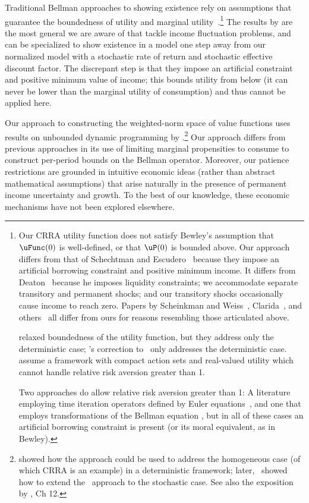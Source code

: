 \documentclass[BufferStockTheory]{subfiles}
\begin{document}
Traditional Bellman approaches to showing existence rely on assumptions that guarantee the boundedness of utility and marginal utility~\citep{slpMethods}.\footnote{Our CRRA utility function does not satisfy Bewley's assumption that $\uFunc(0)$ is well-defined, or that $\uP(0)$ is bounded above. 
  Our approach differs from that of Schechtman and Escudero~\citeyearpar{seIncFluct} because they impose an artificial borrowing constraint and positive minimum income.
  It differs from Deaton~\citeyearpar{deatonLiqConstr} because he imposes liquidity constraints; we accommodate separate transitory and permanent shocks; and our transitory shocks occasionally cause income to reach zero.
  Papers by Scheinkman and Weiss~\citeyearpar{scheinkman&weiss:borrowing}, Clarida~\citep{claridaErgodic}, and others~\cite{cwcUnderUncert} all differ from ours for reasons resembling those articulated above.

  \cite{asHomogeneous} relaxed boundedness of the utility function, but they address only the deterministic case; \cite{mvExistence}'s correction to~\cite{rrExistence} only addresses the deterministic case.
  \cite{mnUnique} assume a framework with compact action sets and real-valued utility which cannot handle relative risk aversion greater than 1. 
  
  Two approaches do allow relative risk aversion greater than 1:  A literature employing time iteration operators defined by Euler equations~\citep{deatonLiqConstr, lsIncFluct, mstIncFluct}, and one that employs transformations of the Bellman equation \citep{rinconZapatero2024}, but in all of these cases an artificial borrowing constraint is present (or its moral equivalent, as in Bewley). 
}
The results by \cite{mstIncFluct,maUnboundedDP} are the most general we are aware of that tackle income fluctuation problems, and can be specialized to show existence in a model one step away from our normalized model with a stochastic rate of return and stochastic effective discount factor. The discrepant step is that they impose an artificial constraint and positive minimum value of income; this bounds utility from below (it can never be lower than the marginal utility of consumption) and thus cannot be applied here.

Our approach to constructing the weighted-norm space of value functions uses results on unbounded dynamic programming by \citep{jboydWeighted}.\footnote{\cite{asHomogeneous} showed how the approach could be used to address the homogeneous case (of which CRRA is an example) in a deterministic framework; later,~\cite{duranDiscounting} showed how to extend the~\cite{jboydWeighted} approach to the stochastic case.
  See also the exposition by \cite{stachurski2022}, Ch 12.} Our approach differs from previous approaches in its use of limiting marginal propensities to consume to construct per-period bounds on the Bellman operator.
Moreover, our patience restrictions are grounded in intuitive economic ideas (rather than abstract mathematical assumptions) that arise naturally in the presence of permanent income uncertainty and growth.
To the best of our knowledge, these economic mechanisms have not been explored elsewhere.
\end{document}
